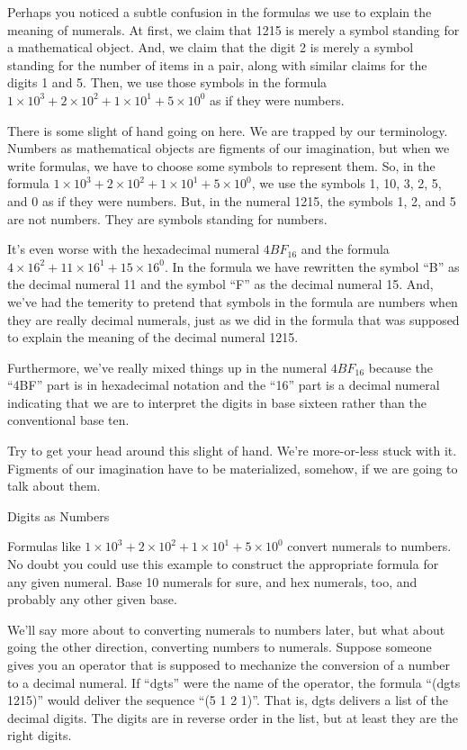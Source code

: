 \begin{aside}
Perhaps you noticed a subtle confusion in the formulas we use
to explain the meaning of numerals. At first, we claim that
1215 is merely a symbol standing for a mathematical object.
And, we claim that the digit 2 is merely a symbol standing
for the number of items in a pair, along with similar
claims for the digits 1 and 5. Then, we use those symbols
in the formula $1 \times 10^3 + 2 \times 10^2 + 1 \times 10^1 + 5 \times 10^0$
as if they were numbers.

There is some slight of hand going on here.
We are trapped by our terminology.
Numbers as mathematical objects are figments of our imagination,
but when we write formulas, we have to choose some symbols to
represent them.
So, in the formula $1 \times 10^3 + 2 \times 10^2 + 1 \times 10^1 + 5 \times 10^0$,
we use the symbols 1, 10, 3, 2, 5, and 0 as if they were numbers.
But, in the numeral 1215, the symbols 1, 2, and 5 are not numbers.
They are symbols standing for numbers.

It's even worse with the hexadecimal numeral $4BF_{16}$
and the formula $4 \times 16^2 + 11 \times 16^1 + 15 \times 16^0$.
In the formula we have rewritten the symbol ``B'' as the decimal numeral 11
and the symbol ``F'' as the decimal numeral 15.
And, we've had the temerity to pretend that symbols
in the formula are numbers when they are really decimal numerals,
just as we did in the formula that was supposed to explain
the meaning of the decimal numeral 1215.

Furthermore, we've really mixed things up in the numeral
$4BF_{16}$ because the ``4BF'' part is in hexadecimal notation
and the ``16'' part is a decimal numeral indicating that we are
to interpret the digits in base sixteen rather than the conventional base ten.

Try to get your head around this slight of hand.
We're more-or-less stuck with it. Figments of our imagination have
to be materialized, somehow, if we are going to talk about them.
\caption{Digits as Numbers}
\label{aside-digits-as-numbers}
\end{aside}

Formulas like $1 \times 10^3 + 2 \times 10^2 + 1 \times 10^1 + 5 \times 10^0$
convert numerals to numbers.
No doubt you could use this example to construct the appropriate formula
for any given numeral. Base 10 numerals for sure, and hex numerals, too,
and probably any other given base.

We'll say more about to converting numerals to numbers later,
but what about going the other direction, converting
numbers to numerals.
Suppose someone gives you an operator that is supposed to
mechanize the conversion of a number to a decimal numeral.
If ``dgts'' were the name of the operator, the formula
``(dgts 1215)'' would deliver the sequence ``(5 1 2 1)''.
That is, dgts delivers a list of the decimal digits.
The digits are in reverse order in the list,
but at least they are the right digits.

